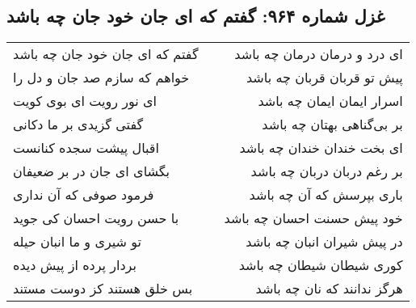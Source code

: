 \begin{center}
\section*{غزل شماره ۹۶۴: گفتم که ای جان خود جان چه باشد}
\label{sec:0964}
\begin{longtable}{l p{0.5cm} r}
گفتم که ای جان خود جان چه باشد
&&
ای درد و درمان درمان چه باشد
\\
خواهم که سازم صد جان و دل را
&&
پیش تو قربان قربان چه باشد
\\
ای نور رویت ای بوی کویت
&&
اسرار ایمان ایمان چه باشد
\\
گفتی گزیدی بر ما دکانی
&&
بر بی‌گناهی بهتان چه باشد
\\
اقبال پیشت سجده کنانست
&&
ای بخت خندان خندان چه باشد
\\
بگشای ای جان در بر ضعیفان
&&
بر رغم دربان دربان چه باشد
\\
فرمود صوفی که آن نداری
&&
باری بپرسش که آن چه باشد
\\
با حسن رویت احسان کی جوید
&&
خود پیش حسنت احسان چه باشد
\\
تو شیری و ما انبان حیله
&&
در پیش شیران انبان چه باشد
\\
بردار پرده از پیش دیده
&&
کوری شیطان شیطان چه باشد
\\
بس خلق هستند کز دوست مستند
&&
هرگز ندانند که نان چه باشد
\\
\end{longtable}
\end{center}
